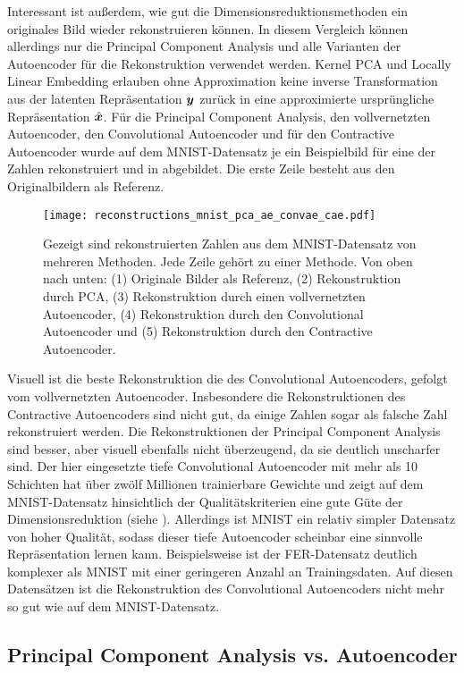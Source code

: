 Interessant ist außerdem, wie gut die Dimensionsreduktionsmethoden ein originales Bild wieder
rekonstruieren können. In diesem Vergleich können allerdings nur die Principal Component Analysis
und alle Varianten der Autoencoder für die Rekonstruktion verwendet werden. Kernel PCA und Locally
Linear Embedding erlauben ohne Approximation keine inverse Transformation aus der latenten
Repräsentation $\bm{y}$ zurück in eine approximierte ursprüngliche Repräsentation
$\hat{\bm{x}}$. Für die Principal Component Analysis, den vollvernetzten Autoencoder, den
Convolutional Autoencoder und für den Contractive Autoencoder wurde auf dem MNIST-Datensatz je ein
Beispielbild für eine der Zahlen rekonstruiert und in 
abgebildet. Die erste Zeile besteht aus den Originalbildern als Referenz.
\begin{figure}[ht]
	\centering
	\texttt{[image: reconstructions\_mnist\_pca\_ae\_convae\_cae.pdf]}
	\caption[Rekonstruierte MNIST-Zahlen]{Gezeigt sind rekonstruierten Zahlen aus dem MNIST-Datensatz von mehreren Methoden. Jede Zeile gehört zu einer Methode. Von oben nach unten: (1) Originale Bilder als Referenz, (2) Rekonstruktion durch PCA, (3) Rekonstruktion durch einen vollvernetzten Autoencoder, (4) Rekonstruktion durch den Convolutional Autoencoder und (5) Rekonstruktion durch den Contractive Autoencoder.}
	\label{fig:MNIST-reconstructions}
\end{figure}
Visuell ist die beste Rekonstruktion die des Convolutional Autoencoders, gefolgt vom vollvernetzten Autoencoder. Insbesondere die Rekonstruktionen des Contractive Autoencoders sind nicht gut, da einige Zahlen sogar als falsche Zahl rekonstruiert werden. Die Rekonstruktionen der Principal Component Analysis sind besser, aber visuell ebenfalls nicht überzeugend, da sie deutlich unscharfer sind. Der hier eingesetzte tiefe Convolutional Autoencoder mit mehr als 10 Schichten hat über zwölf Millionen trainierbare Gewichte und zeigt auf dem MNIST-Datensatz hinsichtlich der Qualitätskriterien eine gute Güte der Dimensionsreduktion (siehe ). Allerdings ist MNIST ein relativ simpler Datensatz von hoher Qualität, sodass dieser tiefe Autoencoder scheinbar eine sinnvolle Repräsentation lernen kann. Beispielsweise ist der FER-Datensatz deutlich komplexer als MNIST mit einer geringeren Anzahl an Trainingsdaten. Auf diesen Datensätzen ist die Rekonstruktion des Convolutional Autoencoders nicht mehr so gut wie auf dem MNIST-Datensatz.

\subsection{Principal Component Analysis vs. Autoencoder}
\label{ch:Vergleich:sec:Resultate:PCA_AE}

